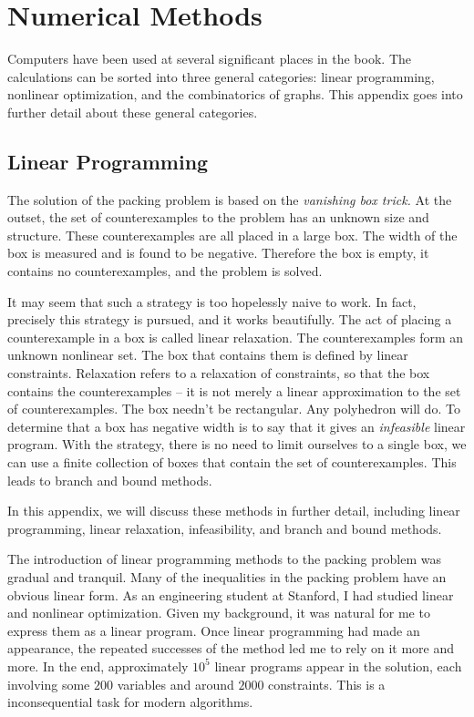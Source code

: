 %
\chapter{Numerical Methods}

Computers have been used at several significant places in the book.     The calculations
can be sorted into three general categories: linear programming, nonlinear
optimization, and the combinatorics of graphs. This
appendix goes into further detail about these general categories.  


\section{Linear Programming}

The solution of the packing problem is based on the {\it vanishing
box trick.}  At the outset, the set of 
counterexamples to the problem has an unknown size and structure.
These counterexamples are all placed in a large box.   
The width of the box is measured and is found to be negative.
Therefore the box is empty, it contains no counterexamples, and
the problem is solved.

It may seem that such a strategy is too hopelessly naive to work.
In fact, precisely this strategy is pursued, and it works beautifully.
The act of placing a counterexample in a box is called linear 
relaxation.  The counterexamples form an unknown nonlinear set.
The box that contains them is defined by linear constraints.  
Relaxation refers to a relaxation of constraints, so that the
box contains the counterexamples -- it is not merely a linear
approximation to the set of counterexamples.  The box needn't be
rectangular.  Any polyhedron will do.  To determine that a box
has negative width is to say that it gives an {\it infeasible} linear
program.  With the strategy, there is no need to limit ourselves
to a single box, we can use a finite collection of boxes that
contain the set of counterexamples.  This leads to branch and bound
methods.


In this appendix, we will discuss these methods in further detail,
including linear programming, linear relaxation,  infeasibility,
and branch and bound methods.

The introduction of linear programming methods to the packing
problem was gradual and tranquil.  
Many of the
inequalities in the packing problem have an obvious linear form.
As an engineering student
at Stanford, I had studied
linear and nonlinear optimization.
Given my background, 
it was natural for me to express them as a linear program.  
Once linear programming had made an appearance, the 
repeated successes of the method led me to rely on it more and more.
In the end, approximately $10^5$ linear programs appear in the solution,
each involving some $200$ variables and around $2000$ constraints.
This is a inconsequential task for modern algorithms.  

